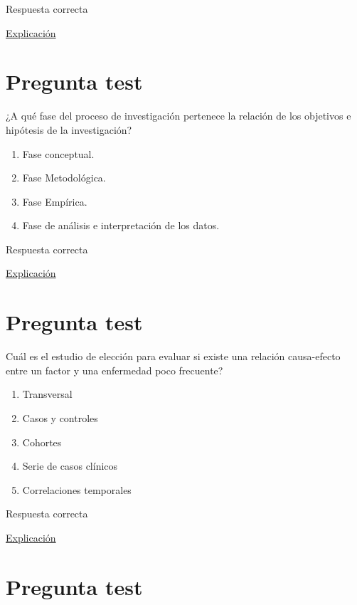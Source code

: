 \documentclass[
]{book}
\providecommand{\tightlist}{%
  \setlength{\itemsep}{0pt}\setlength{\parskip}{0pt}}
\begin{document}
Respuesta correcta

\href{https://1fjmanzano.github.io/bioestadistica/tipos-de-variables.html}{Explicación}

\hypertarget{pregunta-test-35}{%
\section{Pregunta test}\label{pregunta-test-35}}

¿A qué fase del proceso de investigación pertenece la relación de los objetivos e hipótesis de la investigación?

\begin{enumerate}
\def\labelenumi{\alph{enumi})}
\tightlist
\item
  Fase conceptual.
\item
  Fase Metodológica.
\item
  Fase Empírica.
\item
  Fase de análisis e interpretación de los datos.
\end{enumerate}

Respuesta correcta

\href{https://www.salusplay.com/apuntes/apuntes-metodologia-de-la-investigacion/tema-4-el-proceso-de-investigacion-fases-de-realizacion-de-una-investigacion-cientifica/2}{Explicación}

\hypertarget{pregunta-test-36}{%
\section{Pregunta test}\label{pregunta-test-36}}

Cuál es el estudio de elección para evaluar si existe una relación causa-efecto entre un factor y una enfermedad poco frecuente?

\begin{enumerate}
\def\labelenumi{\alph{enumi})}
\tightlist
\item
  Transversal
\item
  Casos y controles
\item
  Cohortes
\item
  Serie de casos clínicos
\item
  Correlaciones temporales
\end{enumerate}

Respuesta correcta

\href{http://www.scielo.org.pe/scielo.php?script=sci_arttext\&pid=S2308-05312020000100138}{Explicación}

\hypertarget{pregunta-test-37}{%
\section{Pregunta test}\label{pregunta-test-37}}
\end{document}
